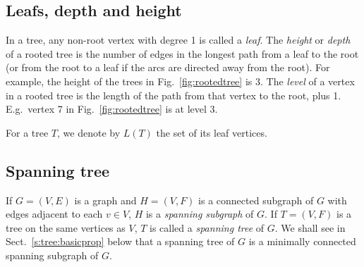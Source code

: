 \documentclass[a4paper]{book}
\theoremstyle{changebreak}                %
\begin{document}
\subsection{Leafs, depth and height}
In a tree, any non-root vertex with
degree 1 is called a {\it
  leaf}. The {\it
  height} or {\it
  depth} of a rooted tree is the number
of edges in the longest path from a leaf to the
root (or from the root to a leaf if the arcs are directed away from
the root). For example, the height of the trees in
Fig.~\ref{fig:rootedtree} is 3. The {\it
  level} of a
vertex in a rooted tree is the length of the path from
that vertex to the root, plus 1. E.g.~vertex 7 in
Fig.~\ref{fig:rootedtree} is at level 3.

For a tree $T$, we denote by $L(T)$ the set of its leaf vertices.

\subsection{Spanning tree}
\label{s:tree:spanning}
If $G=(V,E)$ is a graph and $H=(V,F)$ is a connected subgraph of $G$
with edges adjacent to each $v\in V$, $H$ is a {\it spanning
  subgraph} of $G$. If $T=(V,F)$ is a tree on
the same vertices as $V$, $T$ is called a {\it spanning
  tree} of $G$.  We shall see in
Sect.~\ref{s:tree:basicprop} below that a spanning tree of $G$ is a
minimally connected spanning subgraph of $G$.
\end{document}
